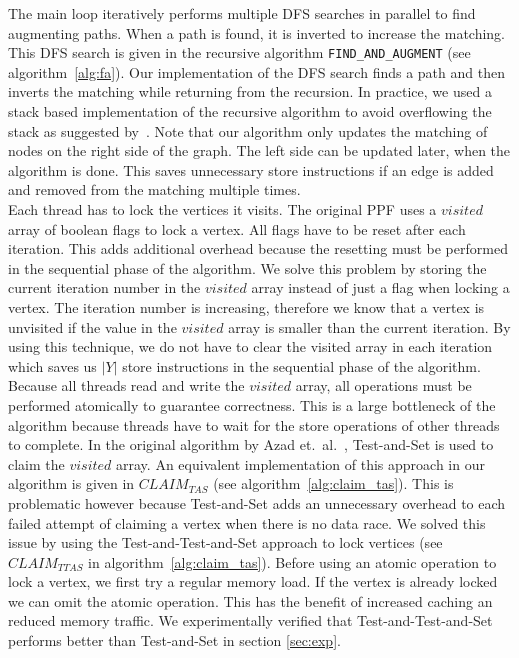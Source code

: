 \documentclass[letterpaper]{article}
\begin{document}
The main loop iteratively performs multiple DFS searches in parallel to find augmenting paths. When a path is found, it is inverted to increase the matching.
This DFS search is given in the recursive algorithm \texttt{FIND\_AND\_AUGMENT} (see algorithm~\ref{alg:fa}). Our implementation of the DFS search finds a path and then inverts the matching while returning from the recursion. 
In practice, we used a stack based implementation of the recursive algorithm to avoid overflowing the stack as suggested by~\cite{Azad:2012}. 
Note that our algorithm only updates the matching of nodes on the right side of the graph. The left side can be updated later, when the algorithm is done. 
This saves unnecessary store instructions if an edge is added and removed from the matching multiple times.\\

Each thread has to lock the vertices it visits. The original PPF uses a $visited$ array of boolean flags to lock a vertex. 
All flags have to be reset after each iteration. This adds additional overhead because the resetting must be performed in the sequential phase of the algorithm.
We solve this problem by storing the current iteration number in the $visited$ array instead of just a flag when locking a vertex. The iteration number is increasing, 
therefore we know that a vertex is unvisited if the value in the $visited$ array is smaller than the current iteration. By using this technique, we do not have to clear
the visited array in each iteration which saves us $|Y|$ store instructions in the sequential phase of the algorithm.\\

Because all threads read and write the $visited$ array, all operations must be performed atomically to guarantee correctness. 
This is a large bottleneck of the algorithm because threads have to wait for the store operations of other threads to complete. 
In the original algorithm by Azad et.\ al.~\cite{Azad:2012}, Test-and-Set is used to claim the $visited$ array. 
An equivalent implementation of this approach in our algorithm is given in \texttt{$CLAIM_{TAS}$} (see algorithm~\ref{alg:claim_tas}). 
This is problematic however because Test-and-Set adds an unnecessary overhead to each failed attempt of claiming a vertex when there is no data race. 
We solved this issue by using the Test-and-Test-and-Set approach to lock vertices (see \texttt{$CLAIM_{TTAS}$} in algorithm~\ref{alg:claim_tas}).
Before using an atomic operation to lock a vertex, we first try a regular memory load. If the vertex is already locked we can omit the atomic operation. 
This has the benefit of increased caching an reduced memory traffic. We experimentally verified that Test-and-Test-and-Set performs better than Test-and-Set in section \ref{sec:exp}.
\end{document}

